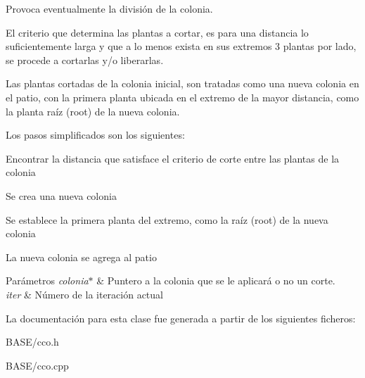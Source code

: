 Provoca eventualmente la división de la colonia. 

El criterio que determina las plantas a cortar, es para una distancia lo suficientemente larga y que a lo menos exista en sus extremos 3 plantas por lado, se procede a cortarlas y/o liberarlas.

Las plantas cortadas de la colonia inicial, son tratadas como una nueva colonia en el patio, con la primera planta ubicada en el extremo de la mayor distancia, como la planta raíz (root) de la nueva colonia.

Los pasos simplificados son los siguientes\+: 
\begin{DoxyItemize}
\item Encontrar la distancia que satisface el criterio de corte entre las plantas de la colonia 
\item Se crea una nueva colonia 
\item Se establece la primera planta del extremo, como la raíz (root) de la nueva colonia 
\item La nueva colonia se agrega al patio 
\end{DoxyItemize}


\begin{DoxyParams}{Parámetros}
{\em colonia$\ast$} & Puntero a la colonia que se le aplicará o no un corte. \\
\hline
{\em iter} & Número de la iteración actual \\
\hline
\end{DoxyParams}


La documentación para esta clase fue generada a partir de los siguientes ficheros\+:\begin{DoxyCompactItemize}
\item 
B\+A\+S\+E/cco.\+h\item 
B\+A\+S\+E/cco.\+cpp\end{DoxyCompactItemize}
